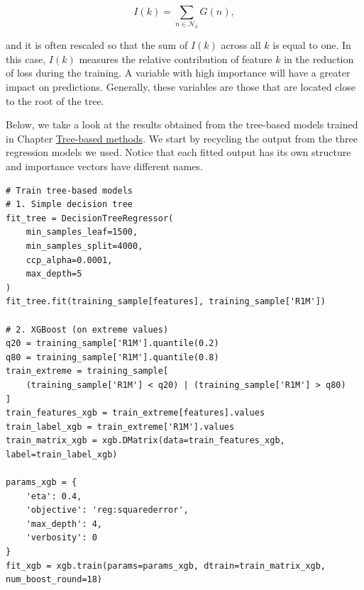 \begin{equation}
I(k)=\sum_{n\in \mathcal{N}_k}G(n),
\end{equation}

and it is often rescaled so that the sum of $I(k)$ across all $k$ is equal to one. In this case, $I(k)$ measures the relative contribution of feature $k$ in the reduction of loss during the training. A variable with high importance will have a greater impact on predictions. Generally, these variables are those that are located close to the root of the tree.

Below, we take a look at the results obtained from the tree-based models trained in Chapter \href{/chap-07-trees}{Tree-based methods}. We start by recycling the output from the three regression models we used. Notice that each fitted output has its own structure and importance vectors have different names.

\begin{verbatim}
# Train tree-based models
# 1. Simple decision tree
fit_tree = DecisionTreeRegressor(
    min_samples_leaf=1500,
    min_samples_split=4000,
    ccp_alpha=0.0001,
    max_depth=5
)
fit_tree.fit(training_sample[features], training_sample['R1M'])

# 2. XGBoost (on extreme values)
q20 = training_sample['R1M'].quantile(0.2)
q80 = training_sample['R1M'].quantile(0.8)
train_extreme = training_sample[
    (training_sample['R1M'] < q20) | (training_sample['R1M'] > q80)
]
train_features_xgb = train_extreme[features].values
train_label_xgb = train_extreme['R1M'].values
train_matrix_xgb = xgb.DMatrix(data=train_features_xgb, label=train_label_xgb)

params_xgb = {
    'eta': 0.4,
    'objective': 'reg:squarederror',
    'max_depth': 4,
    'verbosity': 0
}
fit_xgb = xgb.train(params=params_xgb, dtrain=train_matrix_xgb, num_boost_round=18)
\end{verbatim}

